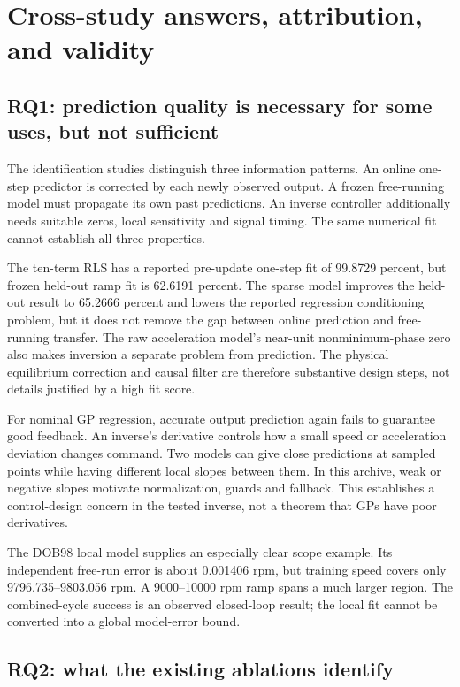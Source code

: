 \chapter{Cross-study answers, attribution, and validity}
\label{ch:synthesis}
\section{RQ1: prediction quality is necessary for some uses, but not sufficient}
The identification studies distinguish three information patterns. An online one-step predictor is corrected by each newly observed output. A frozen free-running model must propagate its own past predictions. An inverse controller additionally needs suitable zeros, local sensitivity and signal timing. The same numerical fit cannot establish all three properties.

The ten-term RLS has a reported pre-update one-step fit of 99.8729 percent, but frozen held-out ramp fit is 62.6191 percent. The sparse model improves the held-out result to 65.2666 percent and lowers the reported regression conditioning problem, but it does not remove the gap between online prediction and free-running transfer. The raw acceleration model's near-unit nonminimum-phase zero also makes inversion a separate problem from prediction. The physical equilibrium correction and causal filter are therefore substantive design steps, not details justified by a high fit score.

For nominal GP regression, accurate output prediction again fails to guarantee good feedback. An inverse's derivative controls how a small speed or acceleration deviation changes command. Two models can give close predictions at sampled points while having different local slopes between them. In this archive, weak or negative slopes motivate normalization, guards and fallback. This establishes a control-design concern in the tested inverse, not a theorem that GPs have poor derivatives.

The DOB98 local model supplies an especially clear scope example. Its independent free-run error is about 0.001406 rpm, but training speed covers only 9796.735--9803.056 rpm. A 9000--10000 rpm ramp spans a much larger region. The combined-cycle success is an observed closed-loop result; the local fit cannot be converted into a global model-error bound.

\section{RQ2: what the existing ablations identify}
